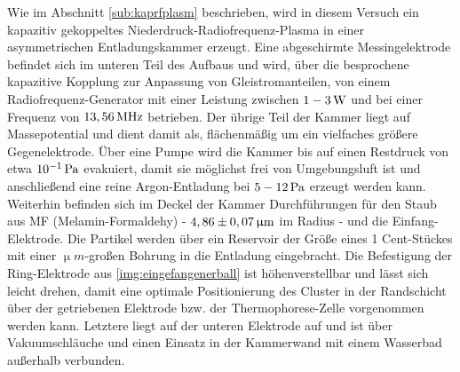 \documentclass[numbers=noenddot,a4paper]{scrartcl}
\newcommand{\tenpo}[1]{ 10^{#1}}
\begin{document}
			Wie im Abschnitt \ref{sub:kaprfplasm} beschrieben, wird in diesem Versuch ein kapazitiv gekoppeltes Niederdruck-Radiofrequenz-Plasma in einer asymmetrischen Entladungskammer erzeugt. Eine abgeschirmte Messingelektrode befindet sich im unteren Teil des Aufbaus und wird, \"uber die besprochene kapazitive Kopplung zur Anpassung von Gleistromanteilen, von einem Radiofrequenz-Generator mit einer Leistung zwischen $\unit[1-3]{W}$ und bei einer Frequenz von $\unit[13,56]{MHz}$ betrieben. Der \"ubrige Teil der Kammer liegt auf Massepotential und dient damit als, fl\"achenm\"a{\ss}ig um ein vielfaches gr\"o{\ss}ere Gegenelektrode. \"Uber eine Pumpe wird die Kammer bis auf einen Restdruck von etwa $\unit[\tenpo{-1}]{Pa}$ evakuiert, damit sie m\"oglichst frei von Umgebungsluft ist und anschlie{\ss}end eine reine Argon-Entladung bei $\unit[5-12]{Pa}$ erzeugt werden kann.
			Weiterhin befinden sich im Deckel der Kammer Durchf\"uhrungen f\"ur den Staub aus MF (Melamin-Formaldehy) - $\unit[4,86\pm0,07]{\upmu m}$ im Radius - und die Einfang-Elektrode. Die Partikel werden \"uber ein Reservoir der Gr\"o{\ss}e eines 1 Cent-St\"uckes mit einer $\unit{\upmu m}$-gro{\ss}en Bohrung in die Entladung eingebracht. Die Befestigung der Ring-Elektrode aus \ref{img:eingefangenerball} ist h\"ohenverstellbar und l\"asst sich leicht drehen, damit eine optimale Positionierung des Cluster in der Randschicht \"uber der getriebenen Elektrode bzw. der Thermophorese-Zelle vorgenommen werden kann. Letztere liegt auf der unteren Elektrode auf und ist \"uber Vakuumschl\"auche und einen Einsatz in der Kammerwand mit einem Wasserbad au{\ss}erhalb verbunden.
\end{document}
